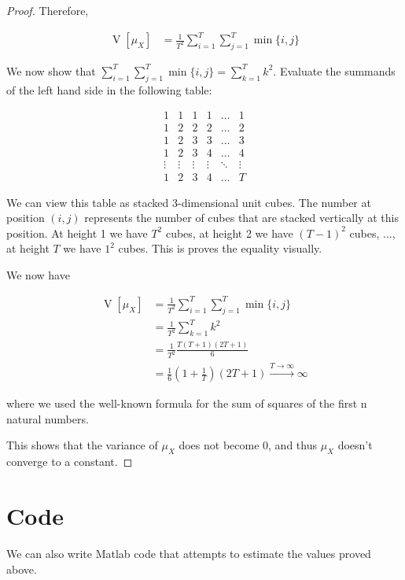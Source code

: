 \documentclass{article}
\DeclareMathOperator{\V}{\mathrm{V}}
\begin{document}
\begin{proof}
    Therefore,

    \begin{equation*}
        \begin{split}
            \V[\mu_X] &= \frac{1}{T^2} \sum_{i=1}^T \sum_{j=1}^T \min\{i, j\}
        \end{split}
    \end{equation*}
    
    We now show that \(\sum_{i=1}^T \sum_{j=1}^T \min\{i, j\} = \sum_{k=1}^T k^2\).
    Evaluate the summands of the left hand side in the following table:

    \begin{equation*}
        \begin{matrix}
            1&1&1&1&\ldots&1\\
            1&2&2&2&\ldots&2\\
            1&2&3&3&\ldots&3\\
            1&2&3&4&\ldots&4\\
            \vdots&\vdots&\vdots&\vdots&\ddots&\vdots\\
            1&2&3&4&\ldots&T
        \end{matrix}
    \end{equation*}

    We can view this table as stacked 3-dimensional unit cubes.
    The number at position \((i, j)\) represents the number of cubes that are stacked vertically at this position.
    At height 1 we have \(T^2\) cubes, at height 2 we have \((T-1)^2\) cubes, \(\dots\), at height \(T\) we have \(1^2\) cubes.
    This is proves the equality visually.

    We now have

    \begin{equation*}
        \begin{split}
            \V[\mu_X] &= \frac{1}{T^2} \sum_{i=1}^T \sum_{j=1}^T \min\{i, j\}\\
                      &= \frac{1}{T^2} \sum_{k=1}^T k^2\\
                      &= \frac{1}{T^2} \frac{T (T+1) (2T+1)}{6}\\
                      &= \frac{1}{6} (1 + \frac{1}{T}) (2T + 1) \xrightarrow{T \to \infty} \infty
        \end{split}
    \end{equation*}

    where we used the well-known formula for the sum of squares of the first n natural numbers.

    This shows that the variance of \(\mu_X\) does not become 0,
    and thus \(\mu_X\) doesn't converge to a constant. 
\end{proof}


\section{Code}

We can also write Matlab code that attempts to estimate the values proved above.


\end{document}
